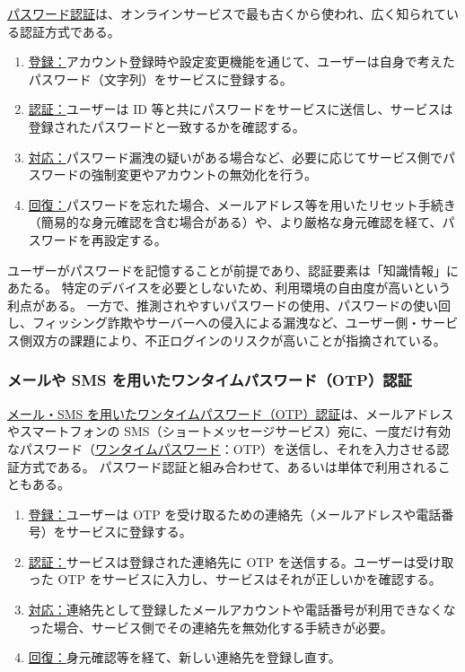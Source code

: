 \documentclass[uplatex]{jsarticle}
\def\label#1{}%
\begin{document}
\begin{dfn}[パスワード認証]\label{dfn:password-auth}
\underline{パスワード認証}は、オンラインサービスで最も古くから使われ、広く知られている認証方式である。
\end{dfn}

\begin{enumerate}
\item \underline{登録：}アカウント登録時や設定変更機能を通じて、ユーザーは自身で考えたパスワード（文字列）をサービスに登録する。
\item \underline{認証：}ユーザーは ID 等と共にパスワードをサービスに送信し、サービスは登録されたパスワードと一致するかを確認する。
\item \underline{対応：}パスワード漏洩の疑いがある場合など、必要に応じてサービス側でパスワードの強制変更やアカウントの無効化を行う。
\item \underline{回復：}パスワードを忘れた場合、メールアドレス等を用いたリセット手続き（簡易的な身元確認を含む場合がある）や、より厳格な身元確認を経て、パスワードを再設定する。
\end{enumerate}

ユーザーがパスワードを記憶することが前提であり、認証要素は「知識情報」にあたる。
特定のデバイスを必要としないため、利用環境の自由度が高いという利点がある。
一方で、推測されやすいパスワードの使用、パスワードの使い回し、フィッシング詐欺やサーバーへの侵入による漏洩など、ユーザー側・サービス側双方の課題により、不正ログインのリスクが高いことが指摘されている。

\subsubsection{メールや SMS を用いたワンタイムパスワード（OTP）認証}

\begin{dfn}\label{dfn:otp-auth}
\underline{メール・SMS を用いたワンタイムパスワード（OTP）認証}は、メールアドレスやスマートフォンの SMS（ショートメッセージサービス）宛に、一度だけ有効なパスワード（\underline{ワンタイムパスワード}：OTP）を送信し、それを入力させる認証方式である。
パスワード認証と組み合わせて、あるいは単体で利用されることもある。
\end{dfn}

\begin{enumerate}
\item \underline{登録：}ユーザーは OTP を受け取るための連絡先（メールアドレスや電話番号）をサービスに登録する。
\item \underline{認証：}サービスは登録された連絡先に OTP を送信する。ユーザーは受け取った OTP をサービスに入力し、サービスはそれが正しいかを確認する。
\item \underline{対応：}連絡先として登録したメールアカウントや電話番号が利用できなくなった場合、サービス側でその連絡先を無効化する手続きが必要。
\item \underline{回復：}身元確認等を経て、新しい連絡先を登録し直す。
\end{enumerate}
\end{document}
